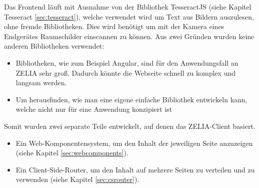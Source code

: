 Das Frontend läuft mit Ausnahme von der Bibliothek TesseractJS (siehe Kapitel Tesseract \ref{sec:tesseract}), welche verwendet wird um Text aus Bildern auszulesen, ohne fremde Bibliotheken. Dies wird benötigt um mit der Kamera eines Endgerätes Raumschilder einscannen zu können. Aus zwei Gründen wurden keine anderen Bibliotheken verwendet:
\begin{itemize}
    \item Bibliotheken, wie zum Beispiel Angular, sind für den Anwendungsfall an ZELIA sehr groß. Dadurch könnte die Webseite schnell zu komplex und langsam werden.
    \item Um herausfinden, wie man eine eigene einfache Bibliothek entwickeln kann, welche nicht nur für eine Anwendung konzipiert ist
\end{itemize}

Somit wurden zwei separate Teile entwickelt, auf denen das ZELIA-Client basiert. 
\begin{itemize}
    \item Ein Web-Komponentensystem, um den Inhalt der jeweiligen Seite anzuzeigen (siehe Kapitel \ref{sec:webcomponents}).
    \item Ein Client-Side-Router, um den Inhalt auf mehrere Seiten zu verteilen und zu verwenden (siehe Kapitel \ref{sec:csrouter}).
\end{itemize}
